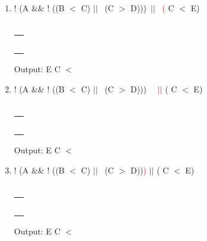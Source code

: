 \documentclass[a4paper]{article}
\begin{document}
\begin{large}
\begin{enumerate}
    \item
          ! (A \&\& ! ((B $<$ C) $||$ \ (C $>$ D)))\ $||$ \   \textcolor{red}{(} C $<$ E)\\
          \\
          \begin{tabular}[t]{ | p{1.6em} | }
            \makecell{ } \\ \hline
            \makecell{}  \\ \hline
            \makecell{}  \\ \hline
            \makecell{}  \\ \hline
            \makecell{}  \\ \hline
            \makecell{}  \\ \hline
          \end{tabular}
          \hspace{2em}
          Output: E C $<$
    \item
          ! (A \&\& ! ((B $<$ C) $||$ \ (C $>$ D)))\ \ \textcolor{red}{ $||$ } ( C $<$ E)\\
          \\
          \begin{tabular}[t]{ | p{1.6em} | }
            \makecell{ }      \\ \hline
            \makecell{}       \\ \hline
            \makecell{}       \\ \hline
            \makecell{}       \\ \hline
            \makecell{}       \\ \hline
            \makecell{ $||$ } \\ \hline
          \end{tabular}
          \hspace{2em}
          Output: E C $<$
    \item
          ! (A \&\& ! ((B $<$ C) $||$ \ (C $>$ D))\textcolor{red}{)}  $||$ ( C $<$ E)\\
          \\
          \begin{tabular}[t]{ | p{1.6em} | }
            \makecell{ }      \\ \hline
            \makecell{}       \\ \hline
            \makecell{}       \\ \hline
            \makecell{}       \\ \hline
            \makecell{)}      \\ \hline
            \makecell{ $||$ } \\ \hline
          \end{tabular}
          \hspace{2em}
          Output: E C $<$


\end{enumerate}
\end{large}
\end{document}
